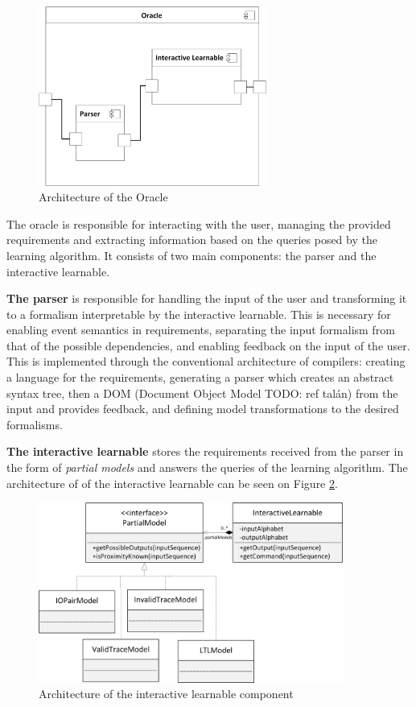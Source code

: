 \begin{figure}[!ht] 
	\centering
		\includegraphics[width=75mm, keepaspectratio]{figures/architecture_oracle.png}
	\caption{Architecture of the Oracle} 
	\label{fig_architcture_oracle}
\end{figure}

The oracle is responsible for interacting with the user, managing the provided requirements and extracting information based on the queries posed by the learning algorithm. It consists of two main components: the parser and the interactive learnable.

\textbf{The parser} is responsible for handling the input of the user and transforming it to a formalism interpretable by the interactive learnable. This is necessary for enabling event semantics in requirements, separating the input formalism from that of the possible dependencies, and enabling feedback on the input of the user. This is implemented through the conventional architecture of compilers: creating a language for the requirements, generating a parser which creates an abstract syntax tree, then a DOM (Document Object Model TODO: ref talán) from the input and provides feedback, and defining model transformations to the desired formalisms.

\textbf{The interactive learnable} stores the requirements received from the parser in the form of \textit{partial models} and answers the queries of the learning algorithm. The architecture of of the interactive learnable can be seen on Figure \ref{fig_architcture_interactivelearnable}.

\begin{figure}[!ht] 
	\centering
	\includegraphics[width=100mm, keepaspectratio]{figures/architecture_interactivelearnable.png}
	\caption{Architecture of the interactive learnable component} 
	\label{fig_architcture_interactivelearnable}
\end{figure}

